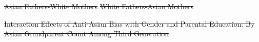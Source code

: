 \documentclass[12pt,english]{article}
\providecommand{\DIFdeltex}[1]{{\protect\color{red}\sout{#1}}}                      %
\providecommand{\DIFdelFL}[1]{\DIFdel{#1}} %
\providecommand{\DIFdel}[1]{\texorpdfstring{\DIFdeltex{#1}}{}} %
\begin{document}
{%
\DIFdelFL{Asian Fathers-White Mothers}}
{%
\DIFdelFL{White Fathers-Asian Mothers}}



{%
\DIFdelFL{Interaction Effects of Anti-Asian Bias with Gender and Parental Education: By Asian Grandparent Count Among Third Generation}}
\DIFdelFL{\label{fig:interaction-coefs-thirdgen-grandparent}
}%
\end{document}
